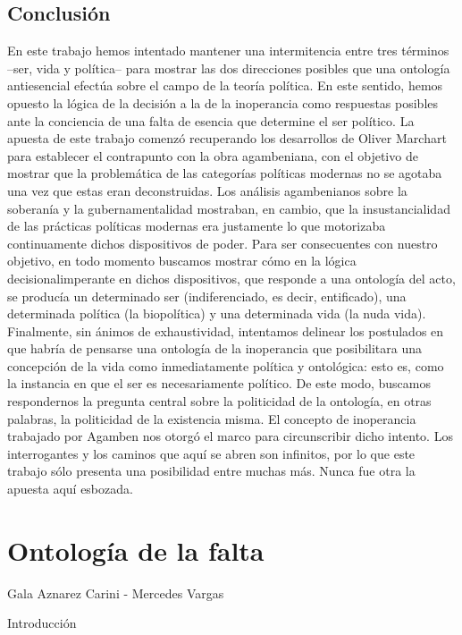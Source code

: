 \section{Conclusión}

En este trabajo hemos intentado mantener una intermitencia entre tres términos --ser, vida y política-- para mostrar las dos direcciones posibles que una ontología antiesencial efectúa sobre el campo de la teoría política. En este sentido, hemos opuesto la lógica de la decisión a la de la inoperancia como respuestas posibles ante la conciencia de una falta de esencia que determine el ser político. La apuesta de este trabajo comenzó recuperando los desarrollos de Oliver Marchart para establecer el contrapunto con la obra agambeniana, con el objetivo de mostrar que la problemática de las categorías políticas modernas no se agotaba una vez que estas eran deconstruidas. Los análisis agambenianos sobre la soberanía y la gubernamentalidad mostraban, en cambio, que la insustancialidad de las prácticas políticas modernas era justamente lo que motorizaba continuamente dichos dispositivos de poder. Para ser consecuentes con nuestro objetivo, en todo momento buscamos mostrar cómo en la lógica decisionalimperante en dichos dispositivos, que responde a una ontología del acto, se producía un determinado ser (indiferenciado, es decir, entificado), una determinada política (la biopolítica) y una determinada vida (la nuda vida). Finalmente, sin ánimos de exhaustividad, intentamos delinear los postulados en que habría de pensarse una ontología de la inoperancia que posibilitara una concepción de la vida como inmediatamente política y ontológica: esto es, como la instancia en que el ser es necesariamente político. De este modo, buscamos respondernos la pregunta central sobre la politicidad de la ontología, en otras palabras, la politicidad de la existencia misma. El concepto de inoperancia trabajado por Agamben nos otorgó el marco para circunscribir dicho intento. Los interrogantes y los caminos que aquí se abren son infinitos, por lo que este trabajo sólo presenta una posibilidad entre muchas más. Nunca fue otra la apuesta aquí esbozada.

\chapter{Ontología de la falta}

Gala Aznarez Carini - Mercedes Vargas


{Introducción}


